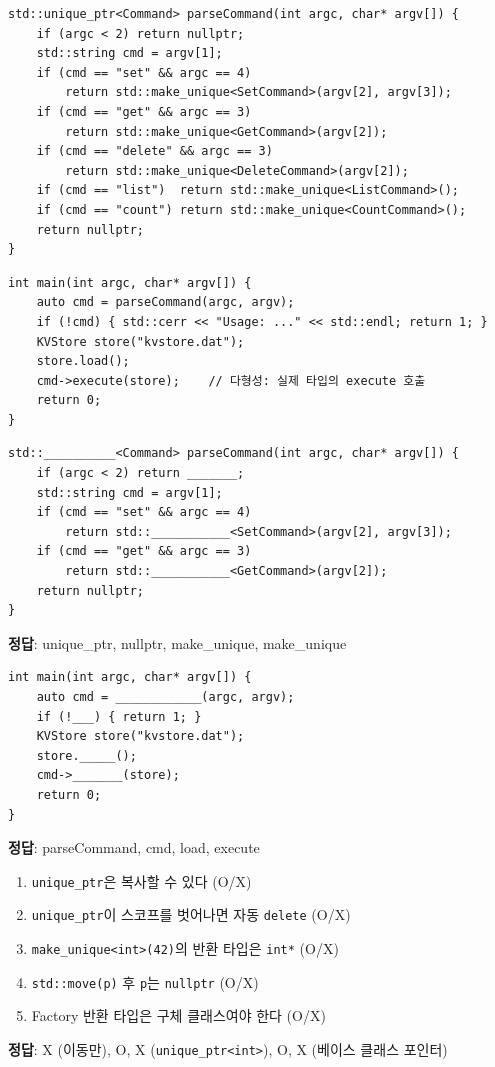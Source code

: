 \documentclass[11pt,a4paper]{article}
\newcommand{\code}[1]{\texttt{#1}}
\begin{document}
\begin{lstlisting}[style=cpp,title={parseCommand() --- Factory}]
std::unique_ptr<Command> parseCommand(int argc, char* argv[]) {
    if (argc < 2) return nullptr;
    std::string cmd = argv[1];
    if (cmd == "set" && argc == 4)
        return std::make_unique<SetCommand>(argv[2], argv[3]);
    if (cmd == "get" && argc == 3)
        return std::make_unique<GetCommand>(argv[2]);
    if (cmd == "delete" && argc == 3)
        return std::make_unique<DeleteCommand>(argv[2]);
    if (cmd == "list")  return std::make_unique<ListCommand>();
    if (cmd == "count") return std::make_unique<CountCommand>();
    return nullptr;
}
\end{lstlisting}

\begin{lstlisting}[style=cpp,title={main.cpp}]
int main(int argc, char* argv[]) {
    auto cmd = parseCommand(argc, argv);
    if (!cmd) { std::cerr << "Usage: ..." << std::endl; return 1; }
    KVStore store("kvstore.dat");
    store.load();
    cmd->execute(store);    // 다형성: 실제 타입의 execute 호출
    return 0;
}
\end{lstlisting}

\begin{quizbox}[title={Q5-1: parseCommand}]
\begin{lstlisting}[style=cpp,numbers=none]
std::__________<Command> parseCommand(int argc, char* argv[]) {
    if (argc < 2) return _______;
    std::string cmd = argv[1];
    if (cmd == "set" && argc == 4)
        return std::___________<SetCommand>(argv[2], argv[3]);
    if (cmd == "get" && argc == 3)
        return std::___________<GetCommand>(argv[2]);
    return nullptr;
}
\end{lstlisting}
\textbf{정답}: unique\_ptr, nullptr, make\_unique, make\_unique
\end{quizbox}

\begin{quizbox}[title={Q5-2: main()}]
\begin{lstlisting}[style=cpp,numbers=none]
int main(int argc, char* argv[]) {
    auto cmd = ____________(argc, argv);
    if (!___) { return 1; }
    KVStore store("kvstore.dat");
    store._____();
    cmd->_______(store);
    return 0;
}
\end{lstlisting}
\textbf{정답}: parseCommand, cmd, load, execute
\end{quizbox}

\begin{quizbox}[title={Q5-3: O/X}]
\begin{enumerate}[nosep]
\item \code{unique\_ptr}은 복사할 수 있다 (O/X)
\item \code{unique\_ptr}이 스코프를 벗어나면 자동 \code{delete} (O/X)
\item \code{make\_unique<int>(42)}의 반환 타입은 \code{int*} (O/X)
\item \code{std::move(p)} 후 \code{p}는 \code{nullptr} (O/X)
\item Factory 반환 타입은 구체 클래스여야 한다 (O/X)
\end{enumerate}
\textbf{정답}: X (이동만), O, X (\code{unique\_ptr<int>}), O, X (베이스 클래스 포인터)
\end{quizbox}
\end{document}
